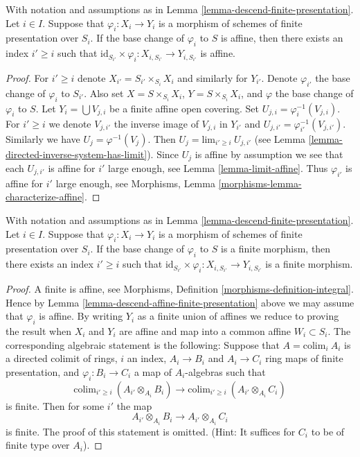 \begin{lemma}
\label{lemma-descend-affine-finite-presentation}
With notation and assumptions as in
Lemma \ref{lemma-descend-finite-presentation}.
Let $i \in I$.
Suppose that $\varphi_i : X_i \to Y_i$ is a morphism of schemes
of finite presentation over $S_i$.
If the base change of $\varphi_i$ to $S$ is affine,
then there exists an index $i' \geq i$ such that
$\text{id}_{S_{i'}} \times \varphi_i : X_{i, S_{i'}} \to Y_{i, S_{i'}}$
is affine.
\end{lemma}

\begin{proof}
For $i' \geq i$ denote $X_{i'} = S_{i'} \times_{S_i} X_i$ and similarly
for $Y_{i'}$. Denote $\varphi_{i'}$ the base change of $\varphi_i$ to
$S_{i'}$. Also set $X = S \times_{S_i} X_i$, $Y =S \times_{S_i} X_i$,
and $\varphi$ the base change of $\varphi_i$ to $S$.
Let $Y_i = \bigcup V_{j, i}$ be a finite affine open covering.
Set $U_{j, i} = \varphi_i^{-1}(V_{j, i})$. For $i' \geq i$ we denote
$V_{j, i'}$ the inverse image of $V_{j, i}$ in $Y_{i'}$ and
$U_{j, i'} = \varphi_{i'}^{-1}(V_{j, i'})$. Similarly we have
$U_j = \varphi^{-1}(V_j)$. Then $U_j = \text{lim}_{i' \geq i}\ U_{j, i'}$
(see Lemma \ref{lemma-directed-inverse-system-has-limit}).
Since $U_j$ is affine by assumption we see that
each $U_{j, i'}$ is affine for $i'$ large enough, see
Lemma \ref{lemma-limit-affine}. Thus $\varphi_{i'}$ is
affine for $i'$ large enough, see
Morphisms, Lemma \ref{morphisms-lemma-characterize-affine}.
\end{proof}

\begin{lemma}
\label{lemma-descend-finite-finite-presentation}
With notation and assumptions as in
Lemma \ref{lemma-descend-finite-presentation}.
Let $i \in I$.
Suppose that $\varphi_i : X_i \to Y_i$ is a morphism of schemes
of finite presentation over $S_i$.
If the base change of $\varphi_i$ to $S$ is a finite morphism,
then there exists an index $i' \geq i$ such that
$\text{id}_{S_{i'}} \times \varphi_i : X_{i, S_{i'}} \to Y_{i, S_{i'}}$
is a finite morphism.
\end{lemma}

\begin{proof}
A finite is affine, see
Morphisms, Definition \ref{morphisms-definition-integral}.
Hence by Lemma \ref{lemma-descend-affine-finite-presentation} above
we may assume that $\varphi_i$ is affine.
By writing $Y_i$ as a finite union of affines we reduce to proving
the result when $X_i$ and $Y_i$ are affine and map
into a common affine $W_i \subset S_i$. The corresponding algebraic
statement is the following: Suppose that $A = \text{colim}_i\ A_i$
is a directed colimit of rings, $i$ an index, $A_i \to B_i$
and $A_i \to C_i$ ring maps of finite presentation, and
$\varphi_i : B_i \to C_i$ a map of $A_i$-algebras such that
$$
\text{colim}_{i' \geq i}\ (A_{i'} \otimes_{A_i} B_i)
\longrightarrow
\text{colim}_{i' \geq i}\ (A_{i'} \otimes_{A_i} C_i)
$$
is finite. Then for some $i'$ the map
$$
A_{i'} \otimes_{A_i} B_i
\longrightarrow
A_{i'} \otimes_{A_i} C_i
$$
is finite. The proof of this statement is omitted. (Hint: It
suffices for $C_i$ to be of finite type over $A_i$).
\end{proof}

